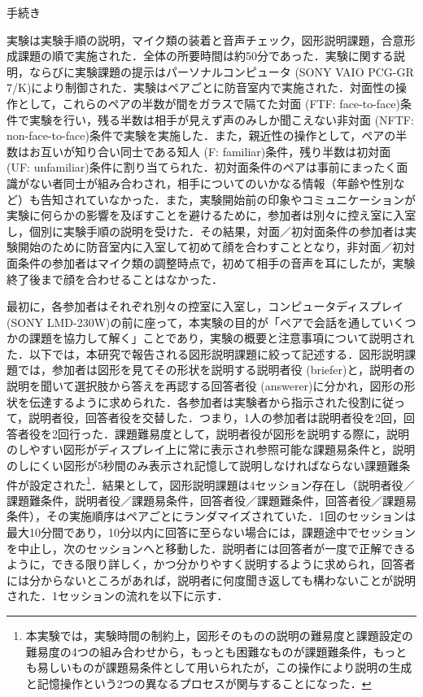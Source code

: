 \documentclass[japanese]{jnlp_1.3a}
\begin{document}
\vspace{10pt}
\noindent 手続き

実験は実験手順の説明，マイク類の装着と音声チェック，図形説明課題，合意形成課題の順で実施された．全体の所要時間は約50分であった．実験に関する説明，ならびに実験課題の提示はパーソナルコンピュータ (SONY VAIO PCG-GR 7/K)により制御された．実験はペアごとに防音室内で実施された．対面性の操作として，これらのペアの半数が間をガラスで隔てた対面 (FTF: face-to-face)条件で実験を行い，残る半数は相手が見えず声のみしか聞こえない非対面 (NFTF: non-face-to-face)条件で実験を実施した．また，親近性の操作として，ペアの半数はお互いが知り合い同士である知人 (F: familiar)条件，残り半数は初対面 (UF: unfamiliar)条件に割り当てられた．初対面条件のペアは事前にまったく面識がない者同士が組み合わされ，相手についてのいかなる情報（年齢や性別など）も告知されていなかった．また，実験開始前の印象やコミュニケーションが実験に何らかの影響を及ぼすことを避けるために，参加者は別々に控え室に入室し，個別に実験手順の説明を受けた．その結果，対面／初対面条件の参加者は実験開始のために防音室内に入室して初めて顔を合わすこととなり，非対面／初対面条件の参加者はマイク類の調整時点で，初めて相手の音声を耳にしたが，実験終了後まで顔を合わせることはなかった．

最初に，各参加者はそれぞれ別々の控室に入室し，コンピュータディスプレイ (SONY LMD-230W)の前に座って，本実験の目的が「ペアで会話を通していくつかの課題を協力して解く」ことであり，実験の概要と注意事項について説明された．以下では，本研究で報告される図形説明課題に絞って記述する．図形説明課題では，参加者は図形を見てその形状を説明する説明者役 (briefer)と，説明者の説明を聞いて選択肢から答えを再認する回答者役 (answerer)に分かれ，図形の形状を伝達するように求められた．各参加者は実験者から指示された役割に従って，説明者役，回答者役を交替した．つまり，1人の参加者は説明者役を2回，回答者役を2回行った．課題難易度として，説明者役が図形を説明する際に，説明のしやすい図形がディスプレイ上に常に表示され参照可能な課題易条件と，説明のしにくい図形が5秒間のみ表示され記憶して説明しなければならない課題難条件が設定された\footnote{本実験では，実験時間の制約上，図形そのものの説明の難易度と課題設定の難易度の4つの組み合わせから，もっとも困難なものが課題難条件，もっとも易しいものが課題易条件として用いられたが，この操作により説明の生成と記憶操作という2つの異なるプロセスが関与することになった．}．結果として，図形説明課題は4セッション存在し（説明者役／課題難条件，説明者役／課題易条件，回答者役／課題難条件，回答者役／課題易条件），その実施順序はペアごとにランダマイズされていた．1回のセッションは最大10分間であり，10分以内に回答に至らない場合には，課題途中でセッションを中止し，次のセッションへと移動した．説明者には回答者が一度で正解できるように，できる限り詳しく，かつ分かりやすく説明するように求められ，回答者には分からないところがあれば，説明者に何度聞き返しても構わないことが説明された．1セッションの流れを以下に示す．
\end{document}

